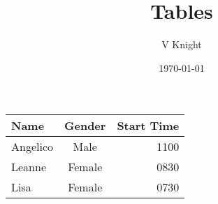 \documentclass{article}
\title{Tables}
\author{V Knight}
\date{\today}
\begin{document}
\maketitle

\begin{tabular}{|l|c|r|}
	\hline
	Name & Gender & Start Time\\
	\hline
	Angelico & Male & 1100\\
	\hline
	Leanne & Female & 0830\\
	\hline
	Lisa & Female & 0730\\
	\hline
\end{tabular}
\end{document}
